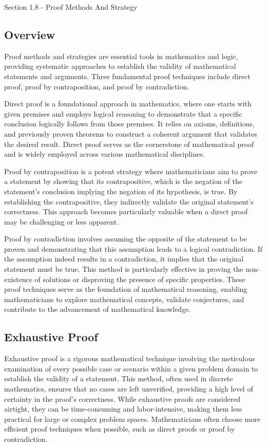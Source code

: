 \begin{notes}{Section 1.8 - Proof Methods And Strategy}
    \subsection*{Overview}

    Proof methods and strategies are essential tools in mathematics and logic, providing systematic approaches to establish the validity of mathematical statements and arguments. Three fundamental 
    proof techniques include direct proof, proof by contraposition, and proof by contradiction.

    Direct proof is a foundational approach in mathematics, where one starts with given premises and employs logical reasoning to demonstrate that a specific conclusion logically follows from those 
    premises. It relies on axioms, definitions, and previously proven theorems to construct a coherent argument that validates the desired result. Direct proof serves as the cornerstone of mathematical 
    proof and is widely employed across various mathematical disciplines.

    Proof by contraposition is a potent strategy where mathematicians aim to prove a statement by showing that its contrapositive, which is the negation of the statement's conclusion implying the 
    negation of its hypothesis, is true. By establishing the contrapositive, they indirectly validate the original statement's correctness. This approach becomes particularly valuable when a direct 
    proof may be challenging or less apparent.

    Proof by contradiction involves assuming the opposite of the statement to be proven and demonstrating that this assumption leads to a logical contradiction. If the assumption indeed results in a 
    contradiction, it implies that the original statement must be true. This method is particularly effective in proving the non-existence of solutions or disproving the presence of specific properties. 
    These proof techniques serve as the foundation of mathematical reasoning, enabling mathematicians to explore mathematical concepts, validate conjectures, and contribute to the advancement of 
    mathematical knowledge.

    \subsection*{Exhaustive Proof}

    Exhaustive proof is a rigorous mathematical technique involving the meticulous examination of every possible case or scenario within a given problem domain to establish the validity of a statement. 
    This method, often used in discrete mathematics, ensures that no cases are left unverified, providing a high level of certainty in the proof's correctness. While exhaustive proofs are considered 
    airtight, they can be time-consuming and labor-intensive, making them less practical for large or complex problem spaces. Mathematicians often choose more efficient proof techniques when possible, 
    such as direct proofs or proof by contradiction.
    

\end{notes}

